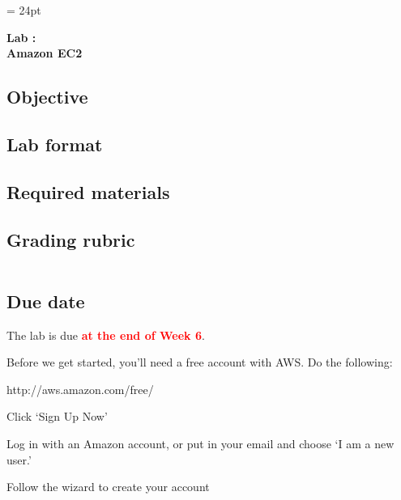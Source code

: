 \documentclass{article}
\newcommand{\labduedate}{at the end of Week 6}
\begin{document}
\chead{\textcolor{Gray}{CSSE491 -- Scalable Computing Lab Assignment}}
\headsep = 24pt

\begin{center}
{ \large
\textbf{Lab \labnumber: \longproductname} \\
\textbf{Amazon EC2}
}
\end{center}

\subsection*{Objective}

\subsection*{Lab format}

\subsection*{Required materials}

\subsection*{Grading rubric}
\begin{tabular}{p{5.5in} r}
\end{tabular}

\subsection*{Due date}
The lab is due \textcolor{red}{\textbf{\labduedate}}.




Before we get started, you'll need a free account with AWS. Do the following:

\begin{enumerate*}
\item http://aws.amazon.com/free/
\item Click `Sign Up Now'
\item Log in with an Amazon account, or put in your email and choose `I am a new user.'
\item Follow the wizard to create your account
\end{enumerate*}
\end{document}
